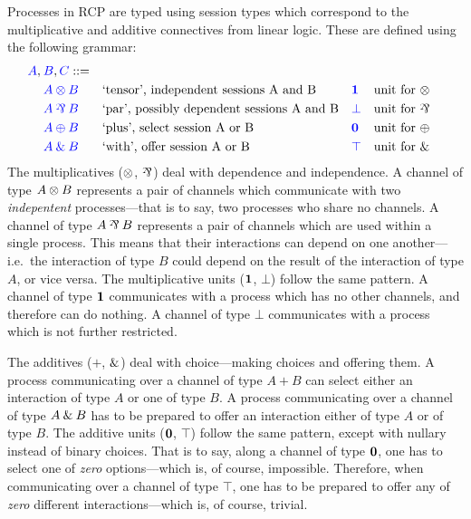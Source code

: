 \documentclass[a4paper,UKenglish]{lipics-v2016}
\begin{document}
Processes in RCP are typed using session types which correspond to the
multiplicative and additive connectives from linear logic. These are defined
using the following grammar:
\[
  \begin{aligned}
    \blue{A},\:&\blue{B},\blue{C} ::=\\
    & \tm{A \tens B} &&\text{`tensor', independent sessions A and B}
    &&\tm{\one}      &&\text{unit for \tens}\\
    & \tm{A \parr B} &&\text{`par', possibly dependent sessions A and B}
    &&\tm{\bot}      &&\text{unit for \parr}\\
    & \tm{A \plus B} &&\text{`plus', select session A or B}
    &&\tm{\nil}      &&\text{unit for \plus}\\
    & \tm{A \with B} &&\text{`with', offer session A or B}
    &&\tm{\top}      &&\text{unit for \with}
  \end{aligned}
\]
The multiplicatives ($\otimes$, $\parr$) deal with dependence and independence.
A channel of type $A \otimes B$ represents a pair of channels which communicate
with two \emph{indepentent} processes---that is to say, two processes who share
no channels.
A channel of type $A \parr B$ represents a pair of channels which are used
within a single process. This means that their interactions can depend on one
another---i.e.\ the interaction of type $B$ could depend on the result of the
interaction of type $A$, or vice versa.
The multiplicative units ($\mathbf{1}$, $\bot$) follow the same pattern.
A channel of type $\mathbf{1}$ communicates with a process which has no other
channels, and therefore can do nothing.
A channel of type $\bot$ communicates with a process which is not further
restricted.

The additives ($\plus$, $\mathbin{\text{\&}}$) deal with choice---making choices and offering
them.
A process communicating over a channel of type $A \plus B$ can select either an
interaction of type $A$ or one of type $B$.
A process communicating over a channel of type $A \mathbin{\text{\&}} B$ has to be prepared to
offer an interaction either of type $A$ or of type $B$.
The additive units ($\mathbf{0}$, $\top$) follow the same pattern, except with nullary
instead of binary choices. That is to say, along a channel of type $\mathbf{0}$, one
has to select one of \emph{zero} options---which is, of course, impossible.
Therefore, when communicating over a channel of type $\top$, one has to be
prepared to offer any of \emph{zero} different interactions---which is, of
course, trivial.
\end{document}
